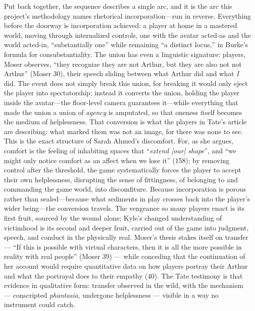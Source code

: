 \documentclass{article}
\begin{document}
Put back together, the sequence describes a single arc, and it is the arc this project's methodology names rhetorical incorporation---run in reverse. Everything before the doorway is incorporation achieved: a player at home in a mastered world, moving through internalized controls, one with the avatar acted-as and the world acted-in, ``substantially one'' while remaining ``a distinct locus,'' in Burke's formula for consubstantiality.
The union has even a linguistic signature: players, Moser observes, ``they recognize they are not Arthur, but they are also not not Arthur'' (Moser 30), their speech sliding between what Arthur did and what \textit{I} did. The event does not simply break this union, for breaking it would only eject the player into spectatorship; instead it converts the union, holding the player inside the avatar---the floor-level camera guarantees it---while everything that made the union a union of \textit{agency} is amputated, so that oneness itself becomes the medium of helplessness. That conversion is what the players in Tate's article are describing: what marked them was not an image, for there was none to see. This is the exact structure of Sarah Ahmed's discomfort. For, as she argues, comfort is the feeling of inhabiting spaces that ``\textit{extend [our] shape}'', and ``we might only notice comfort as an affect when we lose it'' (158); by removing control after the threshold, the game systematically forces the player to accept their own helplessness, disrupting the sense of fittingness, of belonging to and commanding the game world, into discomfiture. Because incorporation is porous rather than sealed---because what sediments in play crosses back into the player's wider being---the conversion travels. The vengeance so many players enact is its first fruit, sourced by the wound alone; Kyle's changed understanding of victimhood is its second and deeper fruit, carried out of the game into judgment, speech, and conduct in the physically real.
Moser's thesis stakes itself on transfer — ``If this is possible with virtual characters, then it is all the more possible in reality with real people'' (Moser 39) — while conceding that the continuation of her account would require quantitative data on how players portray their Arthur and what the portrayal does to their empathy (40). The Tate testimony is that evidence in qualitative form: transfer observed in the wild, with the mechanism — conscripted \textit{phantasia}, undergone helplessness — visible in a way no instrument could catch.
\end{document}
